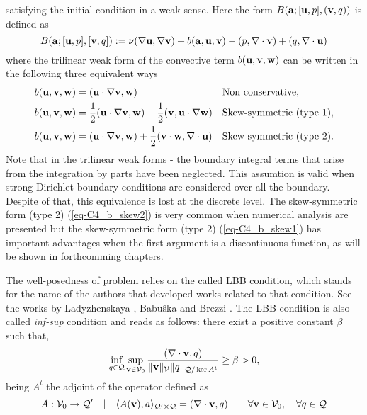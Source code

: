 satisfying the initial condition  in a weak sense. Here the form $B({{\bf a}};[{\bf u},p],({\bf v},q))$ is defined as 
\begin{equation}
\label{eq-C2_bilinear}
B({\bf a};[{\bf u},p],[{\bf v},q]):=\nu(\nabla{\bf u},\nabla{\bf v})+b({\bf a},{\bf u},{\bf v})-(p,\nabla\cdot{\bf v})+(q,\nabla\cdot{\bf u})
\end{equation}
where the trilinear weak form of the convective term $b({\bf u},{\bf v},{\bf w})$ can be written in the following three equivalent ways
\begin{align}
\label{eq-C2_b_noskew}
&b({\bf u},{\bf v},{\bf w})=({\bf u}\cdot\nabla{\bf v},{\bf w})&&\mbox{Non conservative},\\
\label{eq-C2_b_skew1}
&b({\bf u},{\bf v},\mathbf{w})=\frac{1}{2}({\bf u}\cdot\nabla{\bf v},\mathbf{w})-\frac{1}{2}({\bf v},{\bf u}\cdot\nabla\mathbf{w})&&\mbox{Skew-symmetric (type 1)},\\
\label{eq-C2_b_skew2}
&b({\bf u},{\bf v},\mathbf{w})=({\bf u}\cdot\nabla{\bf v},\mathbf{w})+\frac{1}{2}({\bf v}\cdot\mathbf{w},\nabla\cdot{\bf u})&&\mbox{Skew-symmetric (type 2)}.
\end{align}
Note that in the trilinear weak forms - the boundary integral terms that arise from the integration by parts have been neglected. This assumtion is valid when strong Dirichlet boundary conditions are considered over all the boundary. Despite of that, this equivalence is lost at the discrete level. The skew-symmetric form (type 2) (\ref{eq-C4_b_skew2}) is very common when numerical analysis are presented \cite{Badia2013Convergence,Burman2009,guermond_faedogalerkin_2007} but the skew-symmetric form (type 2) (\ref{eq-C4_b_skew1}) has important advantages when the first argument is a discontinuous function, as will be shown in forthcomming chapters.

The well-posedness of problem  relies on the called LBB condition, which stands for the name of the authors that developed works related to that condition. See the works by Ladyzhenskaya \cite{Ladyzhenskaya}, Babu\^{s}ka \cite{babuska} and Brezzi \cite{brezzi}. The LBB condition is also called \textit{inf-sup} condition and reads as follows: there exist a positive constant $ \beta $ such that,
\begin{equation}
\label{eq-C2_lbb}
\inf_{q\in\mathcal{Q}}\sup_{{\bf v}\in\mathcal{V}_0}\frac{(\nabla\cdot{\bf v},q)}{\|{\bf v}\|_\mathcal{V}\|q\|_{\mathcal{Q}/\ker A^t}}\ge\beta>0,
\end{equation}
being $ A^t $ the adjoint of the operator defined as 
\begin{equation}
\label{eq-C2_lbb_operator}
A: \mathcal{V}_0\rightarrow\mathcal{Q'} \quad| \quad\langle A({\bf v}),a\rangle_{\mathcal{Q'}\times\mathcal{Q}}=(\nabla\cdot{\bf v},q)\quad\quad\forall{\bf v}\in\mathcal{V}_0,\quad\forall q\in\mathcal{Q}
\end{equation}

